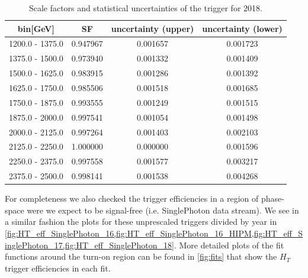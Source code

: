 \begin{table}
	\centering
	\caption{Scale factors and statistical uncertainties of the \HT trigger for 2018.}
	\label{tab:2018_triggerSF}
	\begin{tabular}{cccc}
		\hline
		\HT bin[GeV]    & SF       & uncertainty (upper) & uncertainty (lower) \\
		\hline
		1200.0 - 1375.0 & 0.947967 & 0.001657            & 0.001723            \\
		1375.0 - 1500.0 & 0.973940 & 0.001332            & 0.001409            \\
		1500.0 - 1625.0 & 0.983915 & 0.001286            & 0.001392            \\
		1625.0 - 1750.0 & 0.985506 & 0.001518            & 0.001685            \\
		1750.0 - 1875.0 & 0.993555 & 0.001249            & 0.001515            \\
		1875.0 - 2000.0 & 0.997541 & 0.001054            & 0.001498            \\
		2000.0 - 2125.0 & 0.997264 & 0.001403            & 0.002103            \\
		2125.0 - 2250.0 & 1.000000 & 0.000000            & 0.001596            \\
		2250.0 - 2375.0 & 0.997558 & 0.001577            & 0.003217            \\
		2375.0 - 2500.0 & 0.998141 & 0.001538            & 0.004268            \\
		\hline
	\end{tabular}
\end{table}

For completeness we also checked the trigger efficiencies in a region of phase-space were we expect to be signal-free (i.e. SinglePhoton data stream). We see in a similar fashion the plots for these unprescaled triggers divided by year in \cref{fig:HT_eff_SinglePhoton_16,fig:HT_eff_SinglePhoton_16_HIPM,fig:HT_eff_SinglePhoton_17,fig:HT_eff_SinglePhoton_18}.
More detailed plots of the fit functions around the turn-on region can be found in \cref{fig:fits}
that show the $H_T$ trigger efficiencies in each fit.



